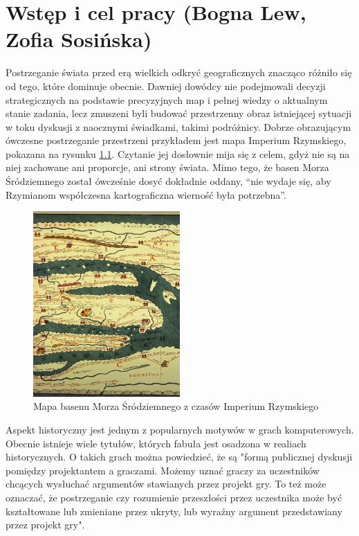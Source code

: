 \chapter{Wstęp i cel pracy (Bogna Lew, Zofia Sosińska)}\label{chap:introduction}

Postrzeganie świata przed erą wielkich odkryć geograficznych znacząco różniło się od tego, które dominuje obecnie. Dawniej
dowódcy nie podejmowali decyzji strategicznych na podstawie precyzyjnych map i pełnej wiedzy o aktualnym stanie zadania,
lecz zmuszeni byli budować przestrzenny obraz istniejącej sytuacji w toku dyskusji z naocznymi świadkami, takimi podróżnicy.
Dobrze obrazującym ówczesne postrzeganie
przestrzeni przykładem jest mapa Imperium Rzymskiego, pokazana na rysunku \ref{fig:mapaIR}. Czytanie jej dosłownie mija się z
celem, gdyż nie są na niej zachowane ani proporcje, ani strony świata. Mimo tego, że basen Morza Śródziemnego został
ówcześnie dosyć dokładnie oddany, “nie wydaje się, aby Rzymianom współczesna kartograficzna wierność była potrzebna”\cite{gbobrektvgry}.

\begin{figure}[htbp]
    \centering
    \includegraphics[width=0.5\textwidth]{images/mapaIR.png}
    \caption{Mapa basenu Morza Śródziemnego z czasów Imperium Rzymskiego}\label{fig:mapaIR}
\end{figure}

Aspekt historyczny jest jednym z popularnych motywów w grach komputerowych. Obecnie istnieje wiele tytułów, których
fabuła jest osadzona w realiach historycznych. O takich grach można powiedzieć, że są "formą publicznej dyskusji
pomiędzy projektantem a graczami. Możemy uznać graczy za uczestników chcących wysłuchać argumentów stawianych przez
projekt gry. To też może oznaczać, że postrzeganie czy rozumienie przeszłości przez uczestnika może być kształtowane lub
zmieniane przez ukryty, lub wyraźny argument przedstawiany przez projekt gry"\cite{perception_past}.

